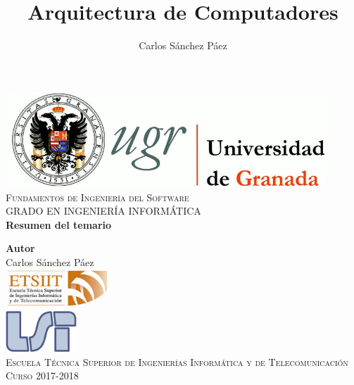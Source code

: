 \documentclass[12pt,spanish]{article}
\title{Arquitectura de Computadores}
\author{Carlos Sánchez Páez}
\begin{document}
\begin{titlepage}

\newlength{\centeroffset}
\setlength{\centeroffset}{-0.5\oddsidemargin}
\addtolength{\centeroffset}{0.5\evensidemargin}
\thispagestyle{empty}

\noindent\hspace*{\centeroffset}
\begin{minipage}{\textwidth}

\centering
\includegraphics[width=0.9\textwidth]{logo_ugr.jpg}\\[1.4cm]

\textsc{ \Large Fundamentos de Ingeniería del Software\\[0.2cm]}
\textsc{GRADO EN INGENIERÍA INFORMÁTICA}\\[1cm]

{\Huge\bfseries Resumen del temario\\}
\end{minipage}

\vspace{1.5cm}
\noindent\hspace*{\centeroffset}
\begin{minipage}{\textwidth}
\centering

\textbf{Autor}\\ {Carlos Sánchez Páez}\\[2.5ex]
\includegraphics[width=0.3\textwidth]{etsiit_logo.png}\\[0.1cm]
\vspace{1.5cm}
\includegraphics[width=0.2\textwidth]{lsi.png}\\[0.1cm]
\vspace{1cm}
\textsc{Escuela Técnica Superior de Ingenierías Informática y de Telecomunicación}\\
\vspace{1cm}
\textsc{Curso 2017-2018}
\end{minipage}
\end{titlepage}
\thispagestyle{empty}
\newpage
\tableofcontents{}
\newpage
\listoffigures
\thispagestyle{empty}
\newpage
\end{document}
